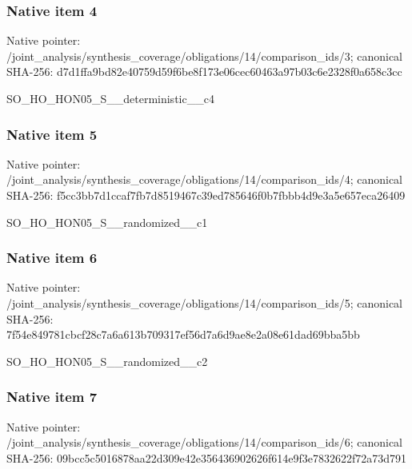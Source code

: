 \documentclass[10pt,a4paper]{article}
\begin{document}
\subsubsection{Native item 4}
Native pointer: /joint\_\allowbreak{}analysis/synthesis\_\allowbreak{}coverage/obligations/14/comparison\_\allowbreak{}ids/3; canonical SHA-256: d7d1ffa9bd82e40759d59f6be8f173e06cec60463a97b03c6e2328f0a658c3cc

\begingroup\raggedright\sloppy SO\_\allowbreak{}HO\_\allowbreak{}HON05\_\allowbreak{}S\_\allowbreak{}\_\allowbreak{}deterministic\_\allowbreak{}\_\allowbreak{}c4\par\endgroup

\subsubsection{Native item 5}
Native pointer: /joint\_\allowbreak{}analysis/synthesis\_\allowbreak{}coverage/obligations/14/comparison\_\allowbreak{}ids/4; canonical SHA-256: f5cc3bb7d1ccaf7fb7d8519467c39ed785646f0b7fbbb4d9e3a5e657eca26409

\begingroup\raggedright\sloppy SO\_\allowbreak{}HO\_\allowbreak{}HON05\_\allowbreak{}S\_\allowbreak{}\_\allowbreak{}randomized\_\allowbreak{}\_\allowbreak{}c1\par\endgroup

\subsubsection{Native item 6}
Native pointer: /joint\_\allowbreak{}analysis/synthesis\_\allowbreak{}coverage/obligations/14/comparison\_\allowbreak{}ids/5; canonical SHA-256: 7f54e849781cbcf28c7a6a613b709317ef56d7a6d9ae8e2a08e61dad69bba5bb

\begingroup\raggedright\sloppy SO\_\allowbreak{}HO\_\allowbreak{}HON05\_\allowbreak{}S\_\allowbreak{}\_\allowbreak{}randomized\_\allowbreak{}\_\allowbreak{}c2\par\endgroup

\subsubsection{Native item 7}
Native pointer: /joint\_\allowbreak{}analysis/synthesis\_\allowbreak{}coverage/obligations/14/comparison\_\allowbreak{}ids/6; canonical SHA-256: 09bcc5c5016878aa22d309e42e356436902626f614e9f3e7832622f72a73d791
\end{document}
